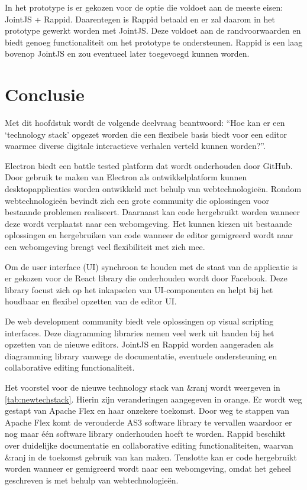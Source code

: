 In het prototype is er gekozen voor de optie die voldoet aan de meeste eisen: JointJS + Rappid. Daarentegen is Rappid betaald en er zal daarom in het prototype gewerkt worden met JointJS. Deze voldoet aan de randvoorwaarden en biedt genoeg functionaliteit om het prototype te ondersteunen. Rappid is een laag bovenop JointJS en zou eventueel later toegevoegd kunnen worden.

\section{Conclusie}
Met dit hoofdstuk wordt de volgende deelvraag beantwoord: “Hoe kan er een ‘technology stack’ opgezet worden die een flexibele basis biedt voor een editor waarmee diverse digitale interactieve verhalen verteld kunnen worden?”.

Electron biedt een battle tested platform dat wordt onderhouden door GitHub. Door gebruik te maken van Electron als ontwikkelplatform kunnen desktopapplicaties worden ontwikkeld met behulp van webtechnologieën. Rondom webtechnologieën bevindt zich een grote community die oplossingen voor bestaande problemen realiseert. Daarnaast kan code hergebruikt worden wanneer deze wordt verplaatst naar een webomgeving. Het kunnen kiezen uit bestaande oplossingen en hergebruiken van code wanneer de editor gemigreerd wordt naar een webomgeving brengt veel flexibiliteit met zich mee.

Om de user interface (UI) synchroon te houden met de staat van de applicatie is er gekozen voor de React library die onderhouden wordt door Facebook. Deze library focust zich op het inkapselen van UI-componenten en helpt bij het houdbaar en flexibel opzetten van de editor UI.

De web development community biedt vele oplossingen op visual scripting interfaces. Deze diagramming libraries nemen veel werk uit handen bij het opzetten van de nieuwe editors. JointJS en Rappid worden aangeraden als diagramming library vanwege de documentatie, eventuele ondersteuning en collaborative editing functionaliteit.

Het voorstel voor de nieuwe technology stack van \&ranj wordt weergeven in \autoref{tab:newtechstack}. Hierin zijn veranderingen aangegeven in orange. Er wordt weg gestapt van Apache Flex en haar onzekere toekomst. Door weg te stappen van Apache Flex komt de verouderde AS3 software library te vervallen waardoor er nog maar één software library onderhouden hoeft te worden. Rappid beschikt over duidelijke documentatie en collaborative editing functionaliteiten, waarvan \&ranj in de toekomst gebruik van kan maken. Tenslotte kan er code hergebruikt worden wanneer er gemigreerd wordt naar een webomgeving, omdat het geheel geschreven is met behulp van webtechnologieën.

